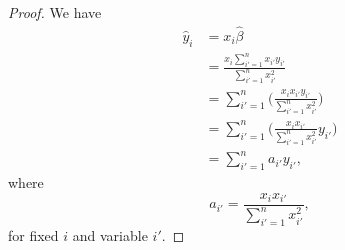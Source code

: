 \begin{proof}
    We have
    \begin{equation*}
        \begin{split}
            \hat{y}_i &= x_i \hat{\beta} \\
            &= \frac{x_i \sum_{i'=1}^{n} x_{i'} y_{i'}}{\sum_{i'=1}^{n}
            x_{i'}^{2}} \\
            &= \sum_{i'=1}^n \Biggl(\frac{x_i x_{i'} y_{i'}}
            {\sum_{i'=1}^{n} x_{i'}^{2}} \Biggr) \\
            &= \sum_{i'=1}^n \Biggl(\frac{x_i x_{i'}}
            {\sum_{i'=1}^{n} x_{i'}^{2}} y_{i'}\Biggr) \\
            &= \sum_{i'=1}^n a_{i'} y_{i'},
        \end{split}
    \end{equation*}
    where
    \[
        a_{i'} = \frac{x_i x_{i'}}{\sum_{i'=1}^{n} x_{i'}^{2}},
    \]
    for fixed $i$ and variable $i'$.
\end{proof}
